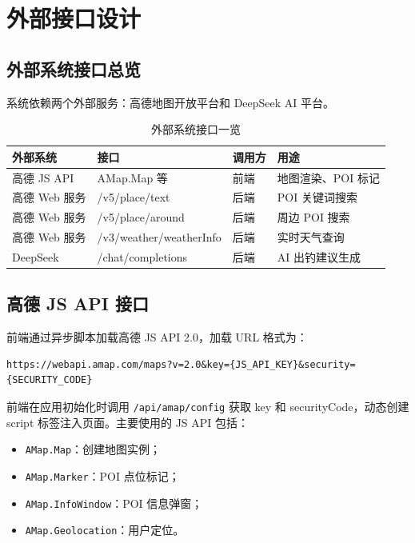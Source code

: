 \documentclass[12pt,a4paper]{ctexart}
\begin{document}
\newpage

\section{外部接口设计}

\subsection{外部系统接口总览}

系统依赖两个外部服务：高德地图开放平台和 DeepSeek AI 平台。

\begin{table}[H]
  \centering
  \caption{外部系统接口一览}
  \label{tab:external-apis}
  \begin{tabular}{p{2.5cm}p{2.5cm}p{3cm}p{4cm}}
    \toprule
    \textbf{外部系统} & \textbf{接口} & \textbf{调用方} & \textbf{用途} \\
    \midrule
    高德 JS API & AMap.Map 等 & 前端 & 地图渲染、POI 标记 \\
    高德 Web 服务 & /v5/place/text & 后端 & POI 关键词搜索 \\
    高德 Web 服务 & /v5/place/around & 后端 & 周边 POI 搜索 \\
    高德 Web 服务 & /v3/weather/weatherInfo & 后端 & 实时天气查询 \\
    DeepSeek & /chat/completions & 后端 & AI 出钓建议生成 \\
    \bottomrule
  \end{tabular}
\end{table}

\subsection{高德 JS API 接口}

前端通过异步脚本加载高德 JS API 2.0，加载 URL 格式为：

\begin{lstlisting}[caption={高德 JS API 加载方式},label={lst:amap-js}]
https://webapi.amap.com/maps?v=2.0&key={JS_API_KEY}&security={SECURITY_CODE}
\end{lstlisting}

前端在应用初始化时调用 \texttt{/api/amap/config} 获取 key 和 securityCode，动态创建 script 标签注入页面。主要使用的 JS API 包括：
\begin{itemize}
  \item \texttt{AMap.Map}：创建地图实例；
  \item \texttt{AMap.Marker}：POI 点位标记；
  \item \texttt{AMap.InfoWindow}：POI 信息弹窗；
  \item \texttt{AMap.Geolocation}：用户定位。
\end{itemize}
\end{document}
